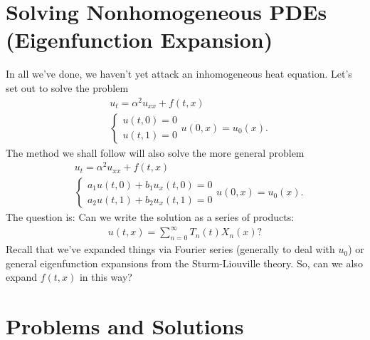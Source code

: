 \documentclass{article}
\theoremstyle{definition}
\begin{document}
\newpage

\section{Solving Nonhomogeneous PDEs (Eigenfunction Expansion)}
In all we've done, we haven't yet attack an inhomogeneous heat equation. Let's set out to solve the problem 
\begin{align*}
&u_t = \alpha^2 u_{xx} + f(t,x)\\
&\begin{cases}
u(t,0) = 0\\
u(t,1) = 0
\end{cases}
u(0,x) = u_0(x).
\end{align*}
The method we shall follow will also solve the more general problem 
\begin{align*}
&u_t = \alpha^2 u_{xx} + f(t,x)\\
&\begin{cases}
a_1u(t,0) + b_1u_x(t,0) = 0\\
a_2u(t,1) + b_2u_x(t,1) = 0
\end{cases}
u(0,x) = u_0(x).
\end{align*}
The question is: Can we write the solution as a series of products:
\begin{align*}
u(t,x) = \sum^\infty_{n=0}T_n(t)X_n(x)?
\end{align*}
Recall that we've expanded things via Fourier series (generally to deal with $u_0$) or general eigenfunction expansions from the Sturm-Liouville theory. So, can we also expand $f(t,x)$ in this way?
































\newpage

\section{Problems and Solutions}
\end{document}
